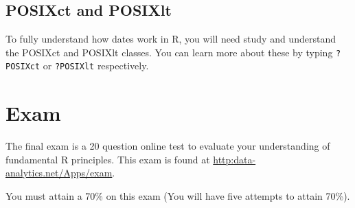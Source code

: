\documentclass[]{book}
\begin{document}
\section{POSIXct and POSIXlt}\label{posixct-and-posixlt}

To fully understand how dates work in R, you will need study and
understand the POSIXct and POSIXlt classes. You can learn more about
these by typing \texttt{?POSIXct} or \texttt{?POSIXlt} respectively.

\chapter{Exam}\label{exam}

The final exam is a 20 question online test to evaluate your
understanding of fundamental R principles. This exam is found at
\url{http:data-analytics.net/Apps/exam}.

You must attain a 70\% on this exam (You will have five attempts to
attain 70\%).


\end{document}
